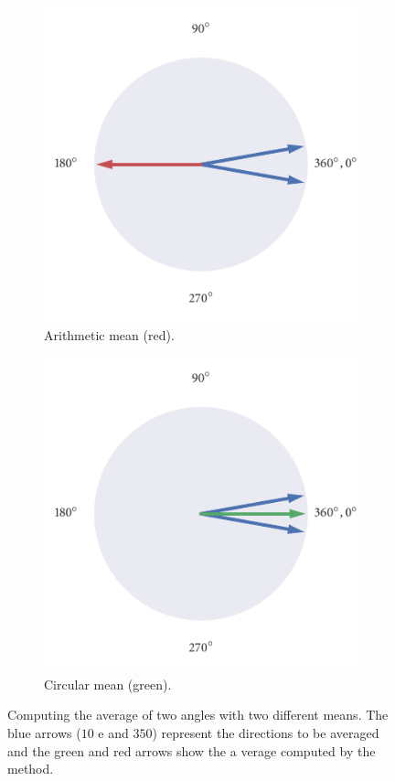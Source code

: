 \begin{figure}
	\begin{subfigure}[b]{0.45\textwidth}
		\includegraphics{arith_mean.pdf}
		\caption{Arithmetic mean (red).}
		\label{subfig:arith_mean}
	\end{subfigure}%
	\hspace{0.05\textwidth}
	\begin{subfigure}[b]{0.45\textwidth}
		\includegraphics{circ_mean.pdf}
		\caption{Circular mean (green).}
		\label{subfig:circ_mean}
	\end{subfigure}
	\caption{Computing the average of two angles with two different means. The blue arrows ($10$\textdegre
e and $350$\textdegree) represent the directions to be averaged and the green and red arrows show the a
verage computed by the method.}
	\label{fig:visualise_mean}
\end{figure}

